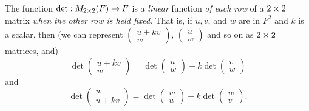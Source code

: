 \begin{theorem} \label{thm 4.1}
The function \(\det: M_{2 \times 2}(F) \to F\) is a \emph{linear} function \emph{of each row} of a \(2 \times 2\) matrix \emph{when the other row is held fixed}.
That is, if \(u, v\), and \(w\) are in \(F^2\) and \(k\) is a scalar, then
(we can represent \(\begin{pmatrix} u + kv \\ w \end{pmatrix}\), \(\begin{pmatrix} u \\ w \end{pmatrix}\) and so on as \(2 \times 2\) matrices, and)
\[
    \det\left(\begin{array}{c} u + kv \\ w \end{array}\right)
    = \det\left(\begin{array}{c} u \\ w \end{array}\right)
    + k \det\left(\begin{array}{c} v \\ w \end{array}\right)
\]
and
\[
    \det\left(\begin{array}{c} w \\ u + k v \end{array}\right)
    = \det\left(\begin{array}{l} w \\ u \end{array}\right)
    + k \det\left(\begin{array}{l} w \\ v \end{array}\right).
\]
\end{theorem}

